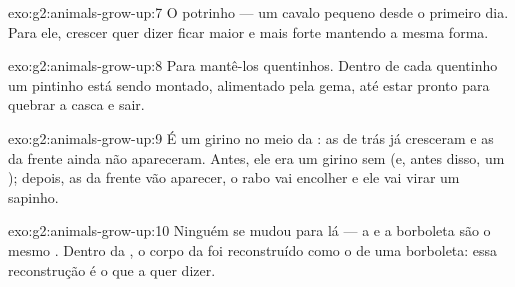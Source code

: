 \begin{solution}{exo:g2:animals-grow-up:7}
O potrinho --- um cavalo pequeno desde o primeiro dia. Para ele,
crescer quer dizer ficar maior e mais forte mantendo a mesma forma.
\end{solution}

\begin{solution}{exo:g2:animals-grow-up:8}
Para mantê-los quentinhos. Dentro de cada  quentinho um pintinho
está sendo montado, alimentado pela gema, até estar pronto para
quebrar a casca e sair.
\end{solution}

\begin{solution}{exo:g2:animals-grow-up:9}
É um girino no meio da : as  de trás já cresceram e
as da frente ainda não apareceram. Antes, ele era um girino sem
 (e, antes disso, um ); depois, as  da frente vão
aparecer, o rabo vai encolher e ele vai virar um sapinho.
\end{solution}

\begin{solution}{exo:g2:animals-grow-up:10}
Ninguém se mudou para lá --- a  e a borboleta são o mesmo
. Dentro da , o corpo da  foi reconstruído
como o de uma borboleta: essa reconstrução é o que a 
quer dizer.
\end{solution}
